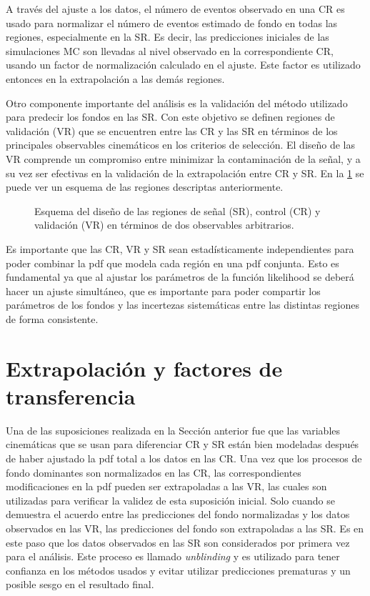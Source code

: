 A través del ajuste a los datos, el número de eventos observado en una CR es
usado para normalizar el número de eventos estimado de fondo en todas las
regiones, especialmente en la SR. Es decir, las predicciones iniciales de las
simulaciones MC son llevadas al nivel observado en la correspondiente CR,
usando un factor de normalización calculado en el ajuste. Este factor es
utilizado entonces en la extrapolación a las demás regiones.

Otro componente importante del análisis es la validación del método utilizado
para predecir los fondos en las SR. Con este objetivo se definen regiones de
validación (VR) que se encuentren entre las CR y las SR en términos de los
principales observables cinemáticos en los criterios de selección. El diseño de
las VR comprende un compromiso entre minimizar la contaminación de la señal, y a su
vez ser efectivas en la validación de la extrapolación entre CR y SR. En la
\cref{fig:regions_sketch} se puede ver un esquema de las regiones descriptas
anteriormente.

\begin{figure}[!htbp]
  \centering 
  \caption{Esquema del diseño de las regiones de señal (SR), control (CR) y
    validación (VR) en términos de dos observables arbitrarios.}
  \label{fig:regions_sketch}
\end{figure}

Es importante que las CR, VR y SR sean estadísticamente independientes para
poder combinar la pdf que modela cada región en una pdf conjunta. Esto es
fundamental ya que al ajustar los parámetros de la función likelihood se deberá
hacer un ajuste simultáneo, que es importante para poder compartir los
parámetros de los fondos y las incertezas sistemáticas entre las distintas
regiones de forma consistente.


\section{Extrapolación y factores de transferencia}

Una de las suposiciones realizada en la Sección anterior fue que las variables
cinemáticas que se usan para diferenciar CR y SR están bien modeladas después de
haber ajustado la pdf total a los datos en las CR. Una vez que los procesos de
fondo dominantes son normalizados en las CR, las correspondientes modificaciones
en la pdf pueden ser extrapoladas a las VR, las cuales son utilizadas para
verificar la validez de esta suposición inicial. Solo cuando se demuestra el
acuerdo entre las predicciones del fondo normalizadas y los datos observados en
las VR, las predicciones del fondo son extrapoladas a las SR.
Es en este paso que los datos observados en las SR son considerados por primera
vez para el análisis. Este proceso es llamado \emph{unblinding} y es
utilizado para tener confianza en los métodos usados y
evitar utilizar predicciones prematuras y un posible sesgo en el
resultado final.

